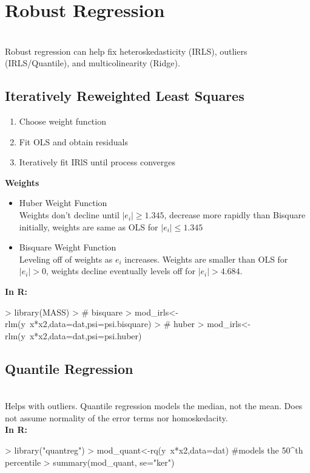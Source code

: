 \documentclass{article}
\begin{document}
\section{Robust Regression}
\\ Robust regression can help fix heteroskedasticity (IRLS), outliers (IRLS/Quantile), and multicolinearity (Ridge).
\subsection{Iteratively Reweighted Least Squares}
\begin{enumerate}
\item Choose weight function
\item Fit OLS and obtain residuals
\item Iteratively fit IRlS until process converges
\end{enumerate}
\textbf{Weights}
\begin{itemize}
\item Huber Weight Function
  \\ Weights don't decline until $|e_i|\geq 1.345$, decrease more rapidly than Bisquare initially, weights are same as OLS for $|e_i|\leq 1.345$
\item Bisquare Weight Function
  \\ Leveling off of weights as $e_i$ increases. Weights are smaller than OLS for $|e_i|>0$, weights decline eventually levels off for $|e_i|>4.684$.
\end{itemize}
\textbf{In R:}
\begin{Schunk}
\begin{Sinput}
> library(MASS)
> # bisquare
> mod_irls<-rlm(y~x*x2,data=dat,psi=psi.bisquare)
> # huber
> mod_irls<-rlm(y~x*x2,data=dat,psi=psi.huber)
\end{Sinput}
\end{Schunk}
\subsection{Quantile Regression}
\\ Helps with outliers. Quantile regression models the median, not the mean. Does not assume normality of the error terms nor homoskedacity.
\\ \textbf{In R:}
\begin{Schunk}
\begin{Sinput}
> library("quantreg")
> mod_quant<-rq(y~x*x2,data=dat) #models the 50^th percentile
> summary(mod_quant, se="ker")
\end{Sinput}
\end{Schunk}
\end{document}
